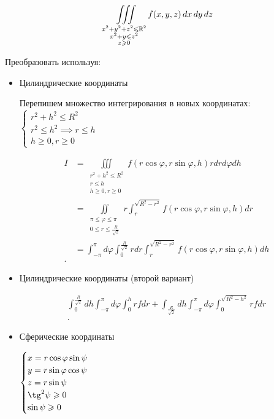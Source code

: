 \begin{example}
        \[\iiint\limits_{\substack{x^2+y^2+z^2 \leqslant \mathbb{R}^2\\ x^2 + y \leqslant z^2\\ z\geqslant 0}} f(x, y, z ) \,dx \,dy \,dz\]

        Преобразовать используя:
        \begin{itemize}
            \item Цилиндрические координаты

            Перепишем множество интегрирования в новых координатах:
            $\begin{cases}
                r^2+h^2 \leqslant R^2\\
                r^2\leqslant h^2 \implies r\leqslant h\\
                h\geqslant 0, r\geqslant 0
            \end{cases}$

            \begin{align*}
                I &= \iiint\limits_{\substack{r^2 + h^2 \leqslant R^2\\ r\leqslant h\\ h\geqslant 0, r\geqslant 0}} f\left( r\cos\varphi, r\sin\varphi, h \right) rdrd\varphi dh\\ 
                &= \iint\limits_{\substack{\pi \leqslant \varphi \leqslant  \pi\\ 0\leqslant r\leqslant \frac{R}{\sqrt 2}}} r \int_{r}^{\sqrt{R^2 - r^2} } f\left( r\cos\varphi, r\sin\varphi, h \right) dr \\
                &= \int_{-\pi}^{\pi}d\varphi \int_0^{\frac{R}{\sqrt 2}} rdr \int_r^{\sqrt{R^2 - r^2}} f\left( r\cos\varphi, r\sin\varphi, h \right) dh \\
            .\end{align*}

            \item Цилиндрические координаты (второй вариант)

             \begin{align*}
                 \int_0^{\frac{R}{\sqrt 2}} dh \int_{-\pi}^{\pi}d\varphi \int_0^h r fdr + \int_{\frac{R}{\sqrt 2}} dh \int_{-\pi}^{\pi}d\varphi \int_0^{\sqrt{R^2 - h^2}} rfdr\\
             .\end{align*}
            \item Сферические координаты

            $\begin{cases}
                x = r\cos\varphi\sin\psi\\
                y = r\sin\varphi\cos\psi\\
                z = r\sin\psi\\
                \tg^2 \psi \geqslant 0\\
                \sin\psi \geqslant 0\\
            \end{cases}$


\end{itemize}
\end{example}
